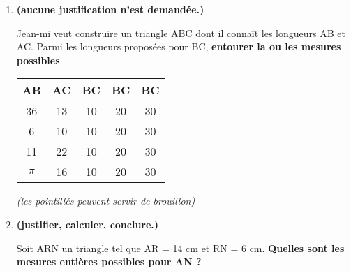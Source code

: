 \begin{enumerate}
  \item[1.] \textbf{(aucune justification n'est demandée.)}

    Jean-mi veut construire un triangle ABC dont il connaît les longueurs AB et AC. \newline
    Parmi les longueurs proposées pour BC, \textbf{entourer la ou les mesures possibles}.

    \begin{multicols}{2}
      \begin{tabular}{|c|c||c|c|c|}
        \hline
          AB & AC & BC & BC & BC\\ \hline
          36 & 13 & 10 & 20 & 30\\ \hline
           6 & 10 & 10 & 20 & 30\\ \hline
          11 & 22 & 10 & 20 & 30\\ \hline
       $\pi$ & 16 & 10 & 20 & 30\\ \hline
      \end{tabular}
      
      \columnbreak

      \textit{(les pointillés peuvent servir de brouillon)}
      \Pointilles[4]
    \end{multicols}

  \item[2.] \textbf{(justifier, calculer, conclure.)}
  
  Soit ARN un triangle tel que AR = 14 cm et RN = 6 cm. \newline
  \textbf{Quelles sont les mesures entières possibles pour AN ?}

  \Pointilles[6]
\end{enumerate} 
